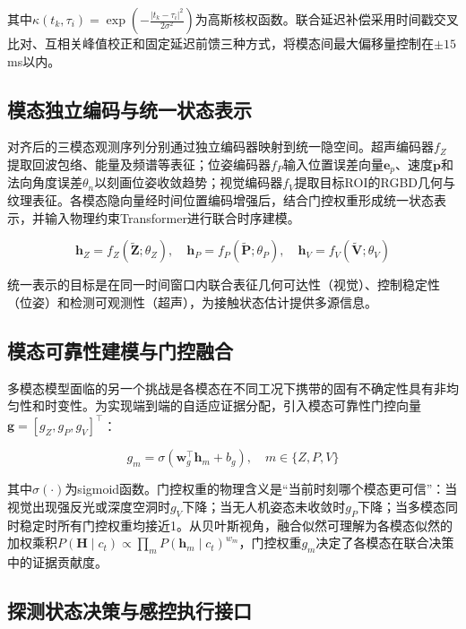其中$\kappa(t_k, \tau_i) = \exp(-\frac{|t_k - \tau_i|^2}{2\sigma^2})$为高斯核权函数。联合延迟补偿采用时间戳交叉比对、互相关峰值校正和固定延迟前馈三种方式，将模态间最大偏移量控制在$\pm 15$ ms以内。

\subsection{模态独立编码与统一状态表示}

对齐后的三模态观测序列分别通过独立编码器映射到统一隐空间。超声编码器$f_Z$提取回波包络、能量及频谱等表征；位姿编码器$f_P$输入位置误差向量$\mathbf{e}_p$、速度$\dot{\mathbf{p}}$和法向角度误差$\theta_n$以刻画位姿收敛趋势；视觉编码器$f_V$提取目标ROI的RGBD几何与纹理表征。各模态隐向量经时间位置编码增强后，结合门控权重形成统一状态表示，并输入物理约束Transformer进行联合时序建模。

\begin{equation}
\mathbf{h}_Z = f_Z(\tilde{\mathbf{Z}}; \theta_Z), \quad \mathbf{h}_P = f_P(\tilde{\mathbf{P}}; \theta_P), \quad \mathbf{h}_V = f_V(\tilde{\mathbf{V}}; \theta_V)
\label{eq:encoders_mm}
\end{equation}

统一表示的目标是在同一时间窗口内联合表征几何可达性（视觉）、控制稳定性（位姿）和检测可观测性（超声），为接触状态估计提供多源信息。

\subsection{模态可靠性建模与门控融合}

多模态模型面临的另一个挑战是各模态在不同工况下携带的固有不确定性具有非均匀性和时变性。为实现端到端的自适应证据分配，引入模态可靠性门控向量$\mathbf{g} = [g_Z, g_P, g_V]^\top$：

\begin{equation}
g_m = \sigma\left(\mathbf{w}_g^\top \mathbf{h}_m + b_g\right), \quad m \in \{Z, P, V\}
\label{eq:gating_mm}
\end{equation}

其中$\sigma(\cdot)$为sigmoid函数。门控权重的物理含义是“当前时刻哪个模态更可信”：当视觉出现强反光或深度空洞时$g_V$下降；当无人机姿态未收敛时$g_P$下降；当多模态同时稳定时所有门控权重均接近1。从贝叶斯视角，融合似然可理解为各模态似然的加权乘积$P(\mathbf{H} \mid c_t) \propto \prod_{m} P(\mathbf{h}_m \mid c_t)^{w_m}$，门控权重$g_m$决定了各模态在联合决策中的证据贡献度。

\subsection{探测状态决策与感控执行接口}

